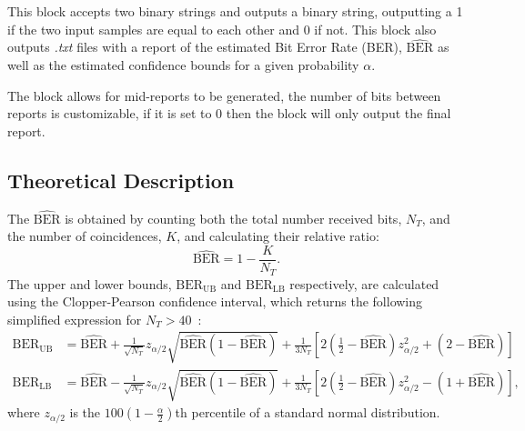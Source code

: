 This block accepts two binary strings and outputs a binary string, outputting a 1 if the two input samples are equal to each other and 0 if not. This block also outputs \textit{.txt} files with a report of the estimated Bit Error Rate (BER), $\widehat{\text{BER}}$ as well as the estimated confidence bounds for a given probability $\alpha$.
\par
The block allows for mid-reports to be generated, the number of bits between reports is customizable, if it is set to 0 then the block will only output the final report.

\subsection*{Theoretical Description}\label{bercalc}
The $\widehat{\text{BER}}$ is obtained by counting both the total number received bits, $N_T$, and the number of coincidences, $K$, and calculating their relative ratio:
\begin{equation}
\widehat{\text{BER}}=1-\frac{K}{N_T}.
\end{equation}
The upper and lower bounds, $\text{BER}_\text{UB}$ and $\text{BER}_\text{LB}$ respectively, are calculated using the Clopper-Pearson confidence interval, which returns the following simplified expression for $N_T>40$~\cite{almeida2016continuous}:
\begin{align}
\text{BER}_\text{UB}&=\widehat{\text{BER}}+\frac{1}{\sqrt{N_T}}z_{\alpha/2}\sqrt{\widehat{\text{BER}}(1-\widehat{\text{BER}})}+\frac{1}{3N_T}\left[2\left(\frac{1}{2}-\widehat{\text{BER}}\right)z_{\alpha/2}^2+(2-\widehat{\text{BER}})\right]\\
\text{BER}_\text{LB}&=\widehat{\text{BER}}-\frac{1}{\sqrt{N_T}}z_{\alpha/2}\sqrt{\widehat{\text{BER}}(1-\widehat{\text{BER}})}+\frac{1}{3N_T}\left[2\left(\frac{1}{2}-\widehat{\text{BER}}\right)z_{\alpha/2}^2-(1+\widehat{\text{BER}})\right],
\end{align}
where $z_{\alpha/2}$ is the $100\left(1-\frac{\alpha}{2}\right)$th percentile of a standard normal distribution.





%
%
% 